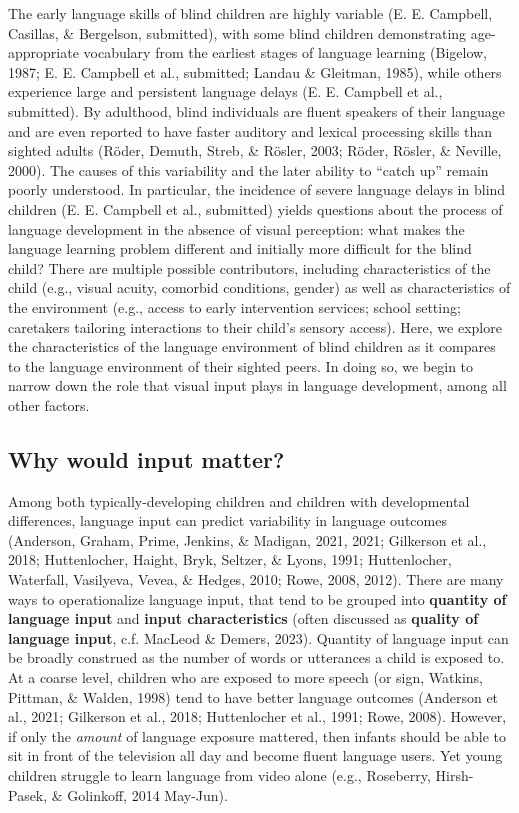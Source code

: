 \documentclass[
  man,floatsintext]{apa6}
\begin{document}
The early language skills of blind children are highly variable (E. E. Campbell, Casillas, \& Bergelson, submitted), with some blind children demonstrating age-appropriate vocabulary from the earliest stages of language learning (Bigelow, 1987; E. E. Campbell et al., submitted; Landau \& Gleitman, 1985), while others experience large and persistent language delays (E. E. Campbell et al., submitted). By adulthood, blind individuals are fluent speakers of their language and are even reported to have faster auditory and lexical processing skills than sighted adults (Röder, Demuth, Streb, \& Rösler, 2003; Röder, Rösler, \& Neville, 2000). The causes of this variability and the later ability to ``catch up'' remain poorly understood. In particular, the incidence of severe language delays in blind children (E. E. Campbell et al., submitted) yields questions about the process of language development in the absence of visual perception: what makes the language learning problem different and initially more difficult for the blind child? There are multiple possible contributors, including characteristics of the child (e.g., visual acuity, comorbid conditions, gender) as well as characteristics of the environment (e.g., access to early intervention services; school setting; caretakers tailoring interactions to their child's sensory access). Here, we explore the characteristics of the language environment of blind children as it compares to the language environment of their sighted peers. In doing so, we begin to narrow down the role that visual input plays in language development, among all other factors.

\hypertarget{why-would-input-matter}{%
\subsection{Why would input matter?}\label{why-would-input-matter}}

Among both typically-developing children and children with developmental differences, language input can predict variability in language outcomes (Anderson, Graham, Prime, Jenkins, \& Madigan, 2021, 2021; Gilkerson et al., 2018; Huttenlocher, Haight, Bryk, Seltzer, \& Lyons, 1991; Huttenlocher, Waterfall, Vasilyeva, Vevea, \& Hedges, 2010; Rowe, 2008, 2012). There are many ways to operationalize language input, that tend to be grouped into \textbf{quantity of language input} and \textbf{input characteristics} (often discussed as \textbf{quality of language input}, c.f. MacLeod \& Demers, 2023). Quantity of language input can be broadly construed as the number of words or utterances a child is exposed to. At a coarse level, children who are exposed to more speech (or sign, Watkins, Pittman, \& Walden, 1998) tend to have better language outcomes (Anderson et al., 2021; Gilkerson et al., 2018; Huttenlocher et al., 1991; Rowe, 2008). However, if only the \emph{amount} of language exposure mattered, then infants should be able to sit in front of the television all day and become fluent language users. Yet young children struggle to learn language from video alone (e.g., Roseberry, Hirsh-Pasek, \& Golinkoff, 2014 May-Jun).
\end{document}
